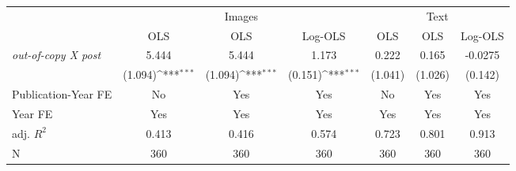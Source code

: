 {
\def\sym#1{\ifmmode^{#1}\else\(^{#1}\)\fi}
\begin{tabular*}{\hsize}{@{\hskip\tabcolsep\extracolsep\fill}l*{6}{c}}
\toprule
            &\multicolumn{3}{c}{Images}                                       &\multicolumn{3}{c}{Text}                                         \\\cmidrule(lr){2-4}\cmidrule(lr){5-7}
            &\multicolumn{1}{c}{OLS}&\multicolumn{1}{c}{OLS}&\multicolumn{1}{c}{Log-OLS}&\multicolumn{1}{c}{OLS}&\multicolumn{1}{c}{OLS}&\multicolumn{1}{c}{Log-OLS}\\
\midrule
\emph{out-of-copy X post}&       5.444         &       5.444         &       1.173         &       0.222         &       0.165         &     -0.0275         \\
            &     (1.094)\sym{***}&     (1.094)\sym{***}&     (0.151)\sym{***}&     (1.041)         &     (1.026)         &     (0.142)         \\
\midrule
Publication-Year FE&          No         &         Yes         &         Yes         &          No         &         Yes         &         Yes         \\
Year FE     &         Yes         &         Yes         &         Yes         &         Yes         &         Yes         &         Yes         \\
adj. $R^2$  &       0.413         &       0.416         &       0.574         &       0.723         &       0.801         &       0.913         \\
N           &         360         &         360         &         360         &         360         &         360         &         360         \\
\bottomrule
\end{tabular*}
}
